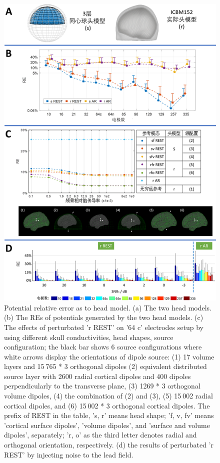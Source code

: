 \begin{figure}[h!]
	\centering
	\includegraphics[width=15cm]{pic/JNE/figure9.png}
	\caption{Potential relative error as to head model. (a) The two head models. (b) The REs of potentials generated by the two head models. (c) The effects of perturbated 'r REST' on '64 c' electrodes setup by using different skull conductivities, head shapes, source configuration; the black bar shows 6 source configurations where white arrows display the orientations of dipole source: (1) 17 volume layers and 15 765 * 3 orthogonal dipoles (2) equivalent distributed source layer with 2600 radial cortical dipoles and 400 dipoles perpendicularly to the transverse plane, (3) 1269 * 3 orthogonal volume dipoles, (4) the combination of (2) and (3), (5) 15 002 radial cortical dipoles, and (6) 15 002 * 3 orthogonal cortical dipoles. The prefix of REST in the table, 's, r' means head shape; 'f, v, fv' means 'cortical surface dipoles', 'volume dipoles', and 'surface and volume dipoles', separately; 'r, o' as the third letter denotes radial and orthogonal orientation, respectively. (d) the results of perturbated 'r REST' by injecting noise to the lead field.}
	\label{2.9}
\end{figure}
